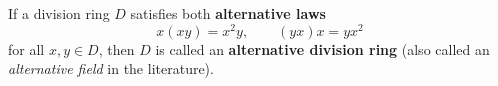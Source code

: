 If a division ring $D$ satisfies both \textbf{alternative laws}
$$x(xy) = x^2 y, \qquad (yx)x = yx^2$$
for all $x, y \in D$, then $D$ is called an \textbf{alternative division ring} (also called an \textit{alternative field} in the literature).
